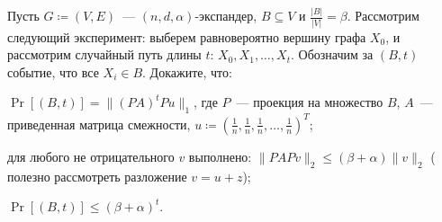 Пусть $G \coloneqq (V, E)$~--- $(n, d, \alpha)$-экспандер, $B \subseteq V$ и $\frac{|B|}{|V|} =
\beta$. Рассмотрим следующий эксперимент: выберем равновероятно вершину графа $X_0$, и рассмотрим
случайный путь длины $t$: $X_0, X_1, \dots, X_t$. Обозначим за $(B, t)$ событие, что все $X_i \in
B$. Докажите, что:
\begin{enumcyr}
    \item $\Pr[(B, t)] = \|(PA)^tP u\|_1$, где $P$~--- проекция на множество $B$, $A$~--- приведенная
        матрица смежности, $u \coloneqq \left(\frac{1}{n}, \frac{1}{n}, \frac{1}{n}, \dots,
        \frac{1}{n}\right)^{T}$;
    \item для любого не отрицательного $v$ выполнено: $\|PAP v\|_2 \le (\beta + \alpha) \|v\|_2$
        ( полезно рассмотреть разложение $v = u + z$);
    \item $\Pr[(B, t)] \le (\beta + \alpha)^t$.
\end{enumcyr}